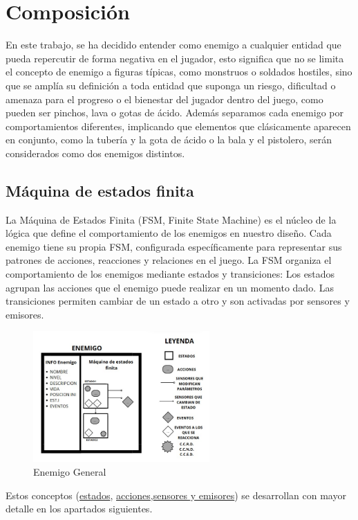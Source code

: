 \section{Composición}
En este trabajo, se ha decidido entender como enemigo a cualquier entidad que pueda repercutir de forma negativa en el jugador, esto significa que no se limita el concepto de enemigo a figuras típicas, como monstruos o soldados hostiles, sino que se amplía su definición a toda entidad que suponga un riesgo, dificultad o amenaza para el progreso o el bienestar del jugador dentro del juego, como pueden ser pinchos, lava o gotas de ácido.
Además separamos cada enemigo por comportamientos diferentes, implicando que elementos que clásicamente aparecen en conjunto, como la tubería y la gota de ácido o la bala y el pistolero, serán considerados como dos enemigos distintos.\\

\subsection{Máquina de estados finita}

La Máquina de Estados Finita (FSM, Finite State Machine) es el núcleo de la lógica que define el comportamiento de los enemigos en nuestro diseño. Cada enemigo tiene su propia FSM, configurada específicamente para representar sus patrones de acciones, reacciones y relaciones en el juego. La FSM organiza el comportamiento de los enemigos mediante estados y transiciones:
Los estados agrupan las acciones que el enemigo puede realizar en un momento dado.
Las transiciones permiten cambiar de un estado a otro y son activadas por sensores y emisores.\\

\begin{figure}[!h]
	\centering
	\includegraphics[height=5cm]{Imagenes/EnemigoGeneral.png}
	\caption{Enemigo General }
	\label{fig:EnemigoGeneral}
\end{figure}
Estos conceptos (\hyperref[subsec:estado]{estados}, \hyperref[subsec:acciones]{acciones},\hyperref[subsec:sensores y emisores]{sensores y emisores}) se desarrollan con mayor detalle en los apartados siguientes.

